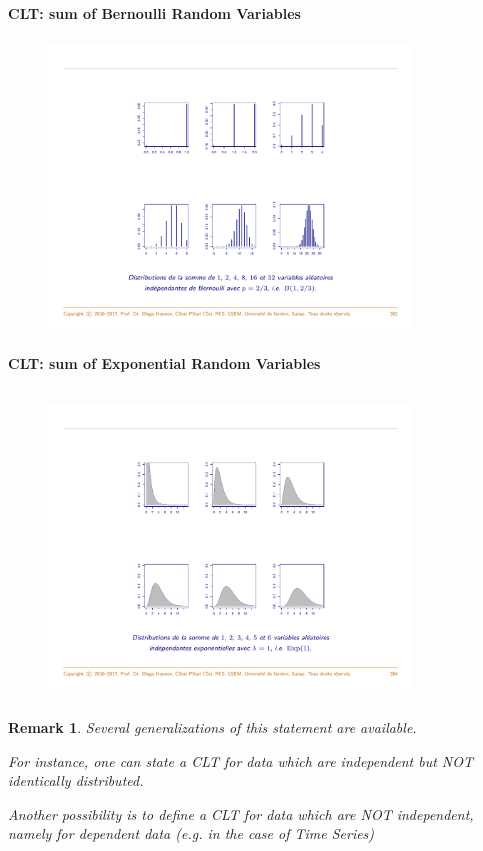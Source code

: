 \documentclass[notes=show,smaller,handout]{beamer}\usepackage[]{graphicx}\usepackage[]{color}
\newtheorem{remark}{Remark}[section]
\begin{document}
\begin{frame}{\secname}
  \framesubtitle{CLT: sum of Bernoulli Random Variables}
  \begin{figure}[ptb]\centering
  \includegraphics[height=3in, width=3.8in]{img/Bernoulli.pdf}%
  \end{figure}
\end{frame}

\begin{frame}{\secname}
  \framesubtitle{CLT: sum of Exponential Random Variables}

  \begin{figure}[ptb]\centering
  \includegraphics[height=3.2in, width=3.8in]{img/Exp.pdf}%
  \end{figure}
\end{frame}


\begin{frame}{\secname}
  \begin{remark}
  Several generalizations of this statement are available. \bigskip

  For instance, one can state a CLT for data which are independent but NOT identically distributed.\bigskip

  Another possibility is to define a CLT for data which are NOT independent, namely for dependent data (e.g. in the case of Time Series)
  \end{remark}
\end{frame}
\end{document}
